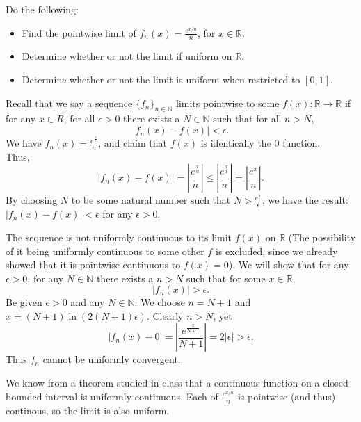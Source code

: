 \documentclass[11 pt]{article}
\begin{document}
\pagebreak
\begin{problem}
	Do the following:
	\begin{itemize}
		\item Find the pointwise limit of $f_n(x)=\frac{e^{x/n}}{n}$, for $x\in\mathbb{R}$.
		\item Determine whether or not the limit if uniform on $\mathbb{R}$.
		\item Determine whether or not the limit is uniform when restricted to $[0,1]$.
	\end{itemize}
\end{problem}
\begin{solution}
	Recall that we say a sequence $\{f_n\}_{n\in\mathbb{N}}$ limits pointwise to some $f(x):\mathbb{R}\to\mathbb{R}$ if for any $x\in R$, for all $\epsilon>0$ there exists a $N\in\mathbb{N}$ such that for all $n>N$,  \[
	|f_n(x)-f(x)|<\epsilon
	.\] 
	We have $f_n(x)=\frac{e^{\frac{x}{n}}}{n}$, and claim that $f(x)$ is identically the 0 function.\\
	Thus, \[	
	|f_n(x)-f(x)|=|\frac{e^{\frac{x}{n}}}{n}|\leq|\frac{e^{\frac{x}{1}}}{n}|=|\frac{e^x}{n}|.\]
	By choosing $N$ to be some natural number such that $N>\frac{e^x}{\epsilon}$, we have the result: $|f_n(x)-f(x)|<\epsilon$ for any $\epsilon>0$.
\end{solution}
\begin{solution}
	The sequence is not uniformly continuous to its limit $f(x)$ on $\mathbb{R}$ (The possibility of it being uniformly continuous to some other $f$ is excluded, since we already showed that it is pointwise continuous to $f(x)=0$). We will show that for any $\epsilon>0$, for any $N\in\mathbb{N}$ there exists a $n>N$ such that for some $x\in\mathbb{R}$, \[
	|f_n(x)|>\epsilon
	.\] 
	Be given $\epsilon>0$ and any $N\in\mathbb{N}$. We choose $n=N+1$ and  $x=(N+1)\ln(2(N+1)\epsilon)$. Clearly $n>N$, yet  \[
	|f_n(x)-0|=|\frac{e^{\frac{x}{N+1}}}{N+1}|=2|\epsilon|>\epsilon
	.\] 
	Thus $f_n$ cannot be uniformly convergent.
\end{solution}
\begin{solution}
	We know from a theorem studied in class that a continuous function on a closed bounded interval is uniformly continuous. Each of $\frac{e^{x/n}}{n}$ is pointwise (and thus) continous, so the limit is also uniform.
\end{solution}
\end{document}
